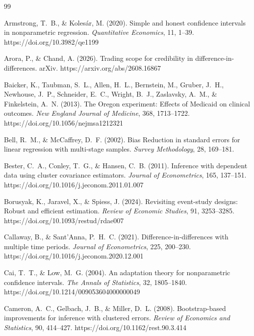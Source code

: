 \documentclass[12pt]{article}
\theoremstyle{definition}
\numberwithin{equation}{section}
\begin{document}
\begin{thebibliography}{99}

 Armstrong, T.~B., \& Koles\'ar, M. (2020). Simple and honest confidence intervals in nonparametric regression. \emph{Quantitative Economics}, 11, 1--39. https://doi.org/10.3982/qe1199

 Arora, P., \& Chand, A. (2026). Trading scope for credibility in difference-in-differences. arXiv. https://arxiv.org/abs/2608.16867

 Baicker, K., Taubman, S.~L., Allen, H.~L., Bernstein, M., Gruber, J.~H., Newhouse, J.~P., Schneider, E.~C., Wright, B.~J., Zaslavsky, A.~M., \& Finkelstein, A.~N. (2013). The Oregon experiment: Effects of Medicaid on clinical outcomes. \emph{New England Journal of Medicine}, 368, 1713--1722. https://doi.org/10.1056/nejmsa1212321

 Bell, R.~M., \& McCaffrey, D.~F. (2002). Bias Reduction in standard errors for linear regression with multi-stage samples. \emph{Survey Methodology}, 28, 169--181.

 Bester, C.~A., Conley, T.~G., \& Hansen, C.~B. (2011). Inference with dependent data using cluster covariance estimators. \emph{Journal of Econometrics}, 165, 137--151. https://doi.org/10.1016/j.jeconom.2011.01.007

 Borusyak, K., Jaravel, X., \& Spiess, J. (2024). Revisiting event-study designs: Robust and efficient estimation. \emph{Review of Economic Studies}, 91, 3253--3285. https://doi.org/10.1093/restud/rdae007

 Callaway, B., \& Sant'Anna, P.~H.~C. (2021). Difference-in-differences with multiple time periods. \emph{Journal of Econometrics}, 225, 200--230. https://doi.org/10.1016/j.jeconom.2020.12.001

 Cai, T.~T., \& Low, M.~G. (2004). An adaptation theory for nonparametric confidence intervals. \emph{The Annals of Statistics}, 32, 1805--1840. https://doi.org/10.1214/009053604000000049

 Cameron, A.~C., Gelbach, J.~B., \& Miller, D.~L. (2008). Bootstrap-based improvements for inference with clustered errors. \emph{Review of Economics and Statistics}, 90, 414--427. https://doi.org/10.1162/rest.90.3.414


\end{thebibliography}
\end{document}
